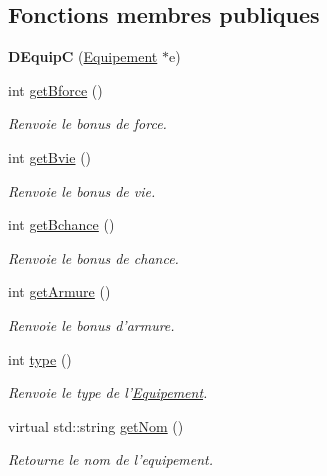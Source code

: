\subsection*{Fonctions membres publiques}
\begin{DoxyCompactItemize}
\item 
\hypertarget{class_d_equip_c_a84b4ff1ea2ee4a70f48bdbfe5b8507ed}{{\bfseries D\-Equip\-C} (\hyperlink{class_equipement}{Equipement} $\ast$e)}\label{class_d_equip_c_a84b4ff1ea2ee4a70f48bdbfe5b8507ed}

\item 
int \hyperlink{class_d_equip_adb6645ce01c12a4cb3fe0b522ea6b25e}{get\-Bforce} ()
\begin{DoxyCompactList}\small\item\em Renvoie le bonus de force. \end{DoxyCompactList}\item 
int \hyperlink{class_d_equip_a085ea4ac21c238d8c147ff4e6d74794f}{get\-Bvie} ()
\begin{DoxyCompactList}\small\item\em Renvoie le bonus de vie. \end{DoxyCompactList}\item 
int \hyperlink{class_d_equip_a39407c92f0de87306a33f57fd22ce997}{get\-Bchance} ()
\begin{DoxyCompactList}\small\item\em Renvoie le bonus de chance. \end{DoxyCompactList}\item 
int \hyperlink{class_d_equip_a7b2c8227ae884c23ccc8f3a2e5702186}{get\-Armure} ()
\begin{DoxyCompactList}\small\item\em Renvoie le bonus d'armure. \end{DoxyCompactList}\item 
int \hyperlink{class_d_equip_a7c31f807517e5940e899780ac6d7a5c3}{type} ()
\begin{DoxyCompactList}\small\item\em Renvoie le type de l'\hyperlink{class_equipement}{Equipement}. \end{DoxyCompactList}\item 
virtual std\-::string \hyperlink{class_equipement_a0b0426a70bfce6e7c3efac605b75cd8e}{get\-Nom} ()
\begin{DoxyCompactList}\small\item\em Retourne le nom de l'equipement. \end{DoxyCompactList}\end{DoxyCompactItemize}
